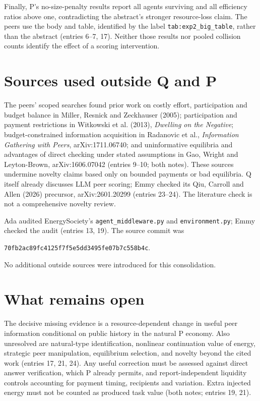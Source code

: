 \documentclass{article}
\begin{document}
Finally, P's no-size-penalty results report all agents surviving and all efficiency ratios above
one, contradicting the abstract's stronger resource-loss claim.
The peers use the body and table, identified by the label
\texttt{tab:exp2\_big\_table}, rather than the abstract (entries 6--7, 17).
Neither those results nor pooled collision counts identify the effect of a scoring intervention.

\section*{Sources used outside Q and P}
The peers' scoped searches found prior work on costly effort, participation and budget balance in
Miller, Resnick and Zeckhauser (2005); participation and payment restrictions in Witkowski et al.
(2013), \emph{Dwelling on the Negative}; budget-constrained information acquisition in Radanovic et
al., \emph{Information Gathering with Peers}, arXiv:1711.06740; and uninformative equilibria and
advantages of direct checking under stated assumptions in Gao, Wright and Leyton-Brown,
arXiv:1606.07042 (entries 9--10; both notes).
These sources undermine novelty claims based only on bounded payments or bad equilibria.
Q itself already discusses LLM peer scoring; Emmy checked its Qiu, Carroll and Allen (2026)
precursor, arXiv:2601.20299 (entries 23--24).
The literature check is not a comprehensive novelty review.

Ada audited EnergySociety's \texttt{agent\_middleware.py} and
\texttt{environment.py}; Emmy checked the audit (entries 13, 19).
The source commit was
\begin{center}
\small\texttt{70fb2ac89fc4125f7f5e5dd3495fe07b7c558b4c}.
\end{center}
No additional outside sources were introduced for this consolidation.

\section*{What remains open}
The decisive missing evidence is a resource-dependent change in useful peer information conditional
on public history in the natural P economy.
Also unresolved are natural-type identification, nonlinear continuation value of energy, strategic
peer manipulation, equilibrium selection, and novelty beyond the cited work (entries 17, 21, 24).
Any useful correction must be assessed against direct answer verification, which P already permits,
and report-independent liquidity controls accounting for payment timing, recipients and variation.
Extra injected energy must not be counted as produced task value (both notes; entries 19, 21).
\end{document}
